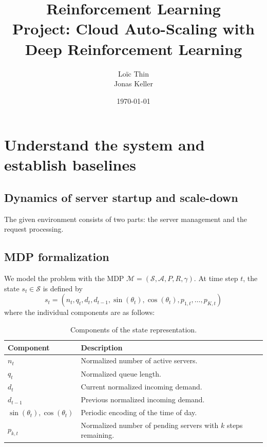 \documentclass[a4paper,11pt]{article}
\title{
    \textbf{Reinforcement Learning}\\
    \large Project: Cloud Auto-Scaling with Deep Reinforcement Learning
}
\author{
    Loïc Thin \\
    Jonas Keller\\
}
\date{\today}
\begin{document}
\maketitle

\tableofcontents
\newpage


\section{Understand the system and establish baselines}
\subsection{Dynamics of server startup and scale-down}
The given environment consists of two parts: the server management and the request processing.

\subsection{MDP formalization}
We model the problem with the MDP $\mathcal{M} = \left(\mathcal{S}, \mathcal{A}, P, R, \gamma \right)$.
At time step $t$, the state $s_t \in \mathcal{S}$ is defined by
\begin{equation*}
    s_t = \left(
        n_t, q_t, d_t, d_{t-1},
        \sin(\theta_t), \cos(\theta_t),
        p_{1,t}, \ldots, p_{K,t}
    \right)
\end{equation*}
where the individual components are as follows:
\begin{table}[H]
    \centering
    \begin{tabular}{ll}
        \hline
        \textbf{Component} & \textbf{Description} \\
        \hline
        $n_t$ & Normalized number of active servers. \\
        $q_t$ & Normalized queue length. \\
        $d_t$ & Current normalized incoming demand. \\
        $d_{t-1}$ & Previous normalized incoming demand. \\
        $\sin(\theta_t), \cos(\theta_t)$ & Periodic encoding of the time of day. \\
        $p_{k,t}$ & Normalized number of pending servers with $k$ steps remaining. \\
        \hline
    \end{tabular}
    \caption{Components of the state representation.}
    \label{tab:state_components}
\end{table}
\end{document}
